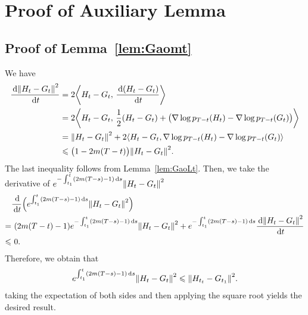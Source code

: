 \section{Proof of Auxiliary Lemma}
\subsection{Proof of Lemma~\ref{lem:Gaomt}}
We have
\begin{align*}
    \dfrac{\rmd\l|H_t-G_t\r|^2}{\rmd t}&=2 \inprod{H_t-G_t}{\dfrac{\rmd(H_t-G_t)}{\rmd t}}\\
    &=2 \inprod{ H_t-G_t}{\dfrac{1}{2}(H_t-G_t)+\big(\nabla\log p_{T-t}(H_t)-\nabla\log p_{T-t}(G_t)\big)}\\
    &=\l|H_t-G_t\r|^2+2\langle H_t-G_t,\nabla\log p_{T-t}(H_t)-\nabla\log p_{T-t}(G_t)\rangle\\
    &\leqslant \big(1-2m(T-t)\big)\l|H_t-G_t\r|^2.
\end{align*}
The last inequality follows from Lemma~\ref{lem:GaoLt}. 
Then, we take the derivative of $e^{-\int_{t_1}^t(2m(T-s)-1)\rmd s}\l|H_t-G_t\r|^2$
\begin{align*}
    &\dfrac{\rmd}{\rmd t} \Big(e^{\int_{t_1}^t(2m(T-s)-1)\rmd s}\l|H_t-G_t\r|^2\Big)\\
    =&\,\,(2m(T-t)-1)e^{-\int_{t_1}^t(2m(T-s)-1)\rmd s}\l|H_t-G_t\r|^2+e^{-\int_{t_1}^t(2m(T-s)-1)\rmd s}\dfrac{\rmd\l|H_t-G_t\r|^2}{\rmd t}\\
    \leqslant& \,\,0.
\end{align*}
Therefore, we obtain that
\begin{align*}
    e^{\int_{t_1}^t(2m(T-s)-1)\rmd s}\l|H_t-G_t\r|^2\leqslant \l|H_{t_t}-G_{t_1}\r|^2. 
\end{align*}
taking the expectation of both sides and then applying the square root yields the desired result.


